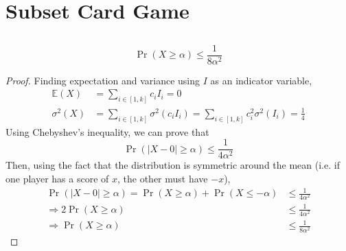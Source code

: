 \documentclass{article}
\newcommand{\E}{\mathbb{E}}
\begin{document}
\section{Subset Card Game}

\subsection{}

\begin{theorem}
    \begin{equation}
        \Pr(X \geqslant \alpha) \leqslant \frac{1}{8 \alpha^2}
    \end{equation}
\end{theorem}
\begin{proof}
    Finding expectation and variance using \(I\) as an indicator variable,
    \begin{align}
        \E(X) &= \sum_{i \in [1, k]} c_i I_i = 0 \\
        \sigma^2(X) &= \sum_{i \in [1, k]} \sigma^2(c_i I_i) = \sum_{i \in [1, k]} c_i^2 \sigma^2(I_i) = \frac{1}{4}
    \end{align}
    Using Chebyshev's inequality, we can prove that
    \begin{equation}
        \Pr(|X - 0| \geqslant \alpha) \leqslant \frac{1}{4\alpha^2}
    \end{equation}
    Then, using the fact that the distribution is symmetric around the mean (i.e. if one player has a score of \(x\), the other must have \(-x\)),
    \begin{align}
        \Pr(|X - 0| \geqslant \alpha) = \Pr(X \geqslant \alpha) + \Pr(X \leqslant -\alpha) &\leqslant \frac{1}{4\alpha^2} \\
        \Rightarrow 2 \Pr(X \geqslant \alpha) &\leqslant \frac{1}{4 \alpha^2} \\
        \Rightarrow \Pr(X \geqslant \alpha) &\leqslant \frac{1}{8 \alpha^2}
    \end{align}
\end{proof}

\subsection{}
\end{document}
